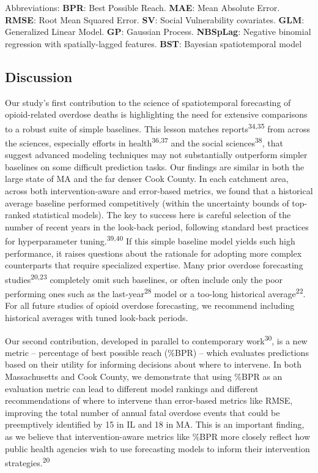 Abbreviations: \textbf{BPR}: Best Possible Reach. \textbf{MAE}: Mean Absolute Error. \textbf{RMSE}: Root Mean Squared Error. \textbf{SV}: Social Vulnerability covariates. \textbf{GLM}: Generalized Linear Model. \textbf{GP}: Gaussian Process. \textbf{NBSpLag}: Negative binomial regression with spatially-lagged features. \textbf{BST}: Bayesian spatiotemporal model

\subsection{\texorpdfstring{Discussion }{Discussion }}\label{discussion}

Our study's first contribution to the science of spatiotemporal forecasting of opioid-related overdose deaths is highlighting the need for extensive comparisons to a robust suite of simple baselines. This lesson matches reports\textsuperscript{34,35} from across the sciences, especially efforts in health\textsuperscript{36,37} and the social sciences\textsuperscript{38}, that suggest advanced modeling techniques may not substantially outperform simpler baselines on some difficult prediction tasks. Our findings are similar in both the large state of MA and the far denser Cook County. In each catchment area, across both intervention-aware and error-based metrics, we found that a historical average baseline performed competitively (within the uncertainty bounds of top-ranked statistical models). The key to success here is careful selection of the number of recent years in the look-back period, following standard best practices for hyperparameter tuning.\textsuperscript{39,40} If this simple baseline model yields such high performance, it raises questions about the rationale for adopting more complex counterparts that require specialized expertise. Many prior overdose forecasting studies\textsuperscript{20,23} completely omit such baselines, or often include only the poor performing ones such as the last-year\textsuperscript{28} model or a too-long historical average\textsuperscript{22}. For all future studies of opioid overdose forecasting, we recommend including historical averages with tuned look-back periods.

Our second contribution, developed in parallel to contemporary work\textsuperscript{30}, is a new metric -- percentage of best possible reach (\%BPR) -- which evaluates predictions based on their utility for informing decisions about where to intervene. In both Massachusetts and Cook County, we demonstrate that using \%BPR as an evaluation metric can lead to different model rankings and different recommendations of where to intervene than error-based metrics like RMSE, improving the total number of annual fatal overdose events that could be preemptively identified by 15 in IL and 18 in MA. This is an important finding, as we believe that intervention-aware metrics like \%BPR more closely reflect how public health agencies wish to use forecasting models to inform their intervention strategies.\textsuperscript{20}

